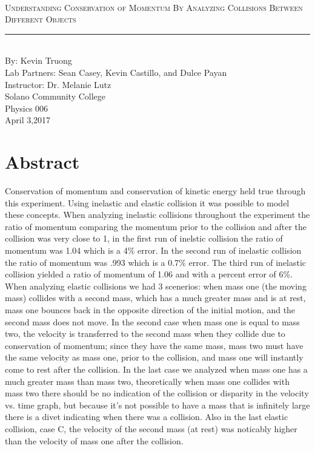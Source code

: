 \documentclass[aps,letterpaper,11pt]{revtex4}
\newcommand{\labno}{8}
\newcommand{\labtitle}{Understanding Conservation of Momentum By Analyzing Collisions Between Different Objects}
\newcommand{\authorname}{Kevin Truong}
\newcommand{\professor}{Dr. Melanie Lutz}
\newcommand{\classno}{Physics 006}
\newcommand{\labpartners}{Sean Casey, Kevin Castillo, and Dulce Payan}
\newcommand{\submitdate}{April 3,2017}
\begin{document}
\begin{titlepage}
\begin{center}
\hspace{-136mm}\boxed{{\Large \textsc{Lab No. \labno}}}\\\vspace{30mm}
{\Large \textsc{\labtitle} \\ \vspace{4pt}}
\rule[13pt]{\textwidth}{1pt}\\ \vspace{150pt}
{\large By: \authorname \\ \vspace{10pt}}
Lab Partners: \labpartners \\
Instructor: \professor \vspace{10pt} \\
Solano Community College\\ \classno \\ \vspace{10pt}
\submitdate
\end{center}
\end{titlepage}

\section{Abstract}

Conservation of momentum and conservation of kinetic energy held true through this experiment. Using inelastic and elastic collision it was possible to model these concepts. When analyzing inelastic collisions throughout the experiment the ratio of momentum comparing the momentum prior to the collision and after the collision was very close to 1, in the first run of inelstic collision the ratio of momentum was 1.04 which is a 4\% error. In the second run of inelastic collision the ratio of momentum was .993 which is a 0.7\% error. The third run of inelastic collision yielded a ratio of momentum of 1.06 and with a percent error of 6\%. When analyzing elastic collisions we had 3 scenerios: when mass one (the moving mass) collides with a second mass, which has a much greater mass and is at rest, mass one bounces back in the opposite direction of the initial motion, and the second mass does not move. In the second case when mass one is equal to mass two, the velocity is transferred to the second mass when they collide due to conservation of momentum; since they have the same mass, mass two must have the same velocity as mass one, prior to the collision, and mass one will instantly come to rest after the collision. In the last case we analyzed when mass one has a much greater mass than mass two, theoretically when mass one collides with mass two there should be no indication of the collision or disparity in the velocity vs. time graph, but because it's not possible to have a mass that is infinitely large there is a divet indicating when there was a collision. Also in the last elastic collision, case C, the velocity of the second mass (at rest) was noticably higher than the velocity of mass one after the collision. 
\end{document}
